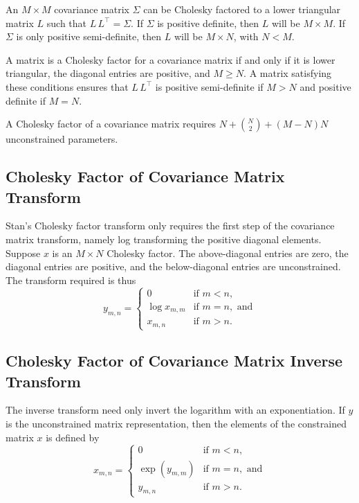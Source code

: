An $M \times M$ covariance matrix $\Sigma$ can be Cholesky factored to
a lower triangular matrix $L$ such that $L\,L^{\top} = \Sigma$.  If
$\Sigma$ is positive definite, then $L$ will be $M \times M$.  If
$\Sigma$ is only positive semi-definite, then $L$ will be $M \times N$,
with $N < M$.

A matrix is a Cholesky factor for a covariance matrix if and only if
it is lower triangular, the diagonal entries are positive, and $M \geq
N$.  A matrix satisfying these conditions ensures that $L \,
L^{\top}$ is positive semi-definite if $M > N$ and positive definite
if $M = N$.

A Cholesky factor of a covariance matrix requires $N + \binom{N}{2} +
(M - N)N$ unconstrained parameters.

\subsection{Cholesky Factor of Covariance Matrix Transform}

Stan's Cholesky factor transform only requires the first step of the
covariance matrix transform, namely log transforming the positive
diagonal elements.  Suppose $x$ is an $M \times N$ Cholesky factor.
The above-diagonal entries are zero, the diagonal entries are
positive, and the below-diagonal entries are unconstrained.  The
transform required is thus
%
\[
y_{m,n} =
\left\{
\begin{array}{cl}
0 & \mbox{if } m < n,
\\[4pt]
\log x_{m,m} & \mbox{if } m = n, \mbox{ and}
\\[4pt]
x_{m,n} & \mbox{if } m > n.
\end{array}
\right.
\]

\subsection{Cholesky Factor of Covariance Matrix Inverse Transform}

The inverse transform need only invert the logarithm with an
exponentiation.  If $y$ is the unconstrained matrix representation,
then the elements of the constrained matrix $x$ is defined by
\[
x_{m,n} =
\left\{
\begin{array}{cl}
0 & \mbox{if } m < n,
\\[4pt]
\exp(y_{m,m}) & \mbox{if } m = n, \mbox{ and}
\\[4pt]
y_{m,n} & \mbox{if } m > n.
\end{array}
\right.
\]

